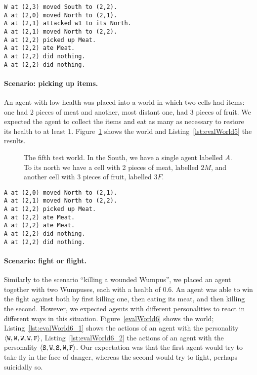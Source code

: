 \noindent
\begin{minipage}{\linewidth}
\begin{lstlisting}[caption=Actions in the scenario ``killing a wounded Wumpus''., label=lst:evalWorld4]
W at (2,3) moved South to (2,2).
A at (2,0) moved North to (2,1).
A at (2,1) attacked w1 to its North.
A at (2,1) moved North to (2,2).
A at (2,2) picked up Meat.
A at (2,2) ate Meat.
A at (2,2) did nothing.
A at (2,2) did nothing.
\end{lstlisting}
\end{minipage}

\paragraph{Scenario: picking up items.} An agent with low health was placed into a world in which two cells had items: one had 2 pieces of meat and another, most distant one, had 3 pieces of fruit. We expected the agent to collect the items and eat as many as necessary to restore its health to at least 1. Figure~\ref{fig:evalWorld5} shows the world and Listing~\ref{lst:evalWorld5} the results.

\begin{figure}
	\centering
	
	\caption{The fifth test world. In the South, we have a single agent labelled $A$. To its north we have a cell with 2 pieces of meat, labelled $2M$, and another cell with 3 pieces of fruit, labelled $3F$.}
	\label{fig:evalWorld5}
\end{figure}

\begin{lstlisting}[caption=Actions in the scenario ``picking up items''., label=lst:evalWorld5]
A at (2,0) moved North to (2,1).
A at (2,1) moved North to (2,2).
A at (2,2) picked up Meat.
A at (2,2) ate Meat.
A at (2,2) ate Meat.
A at (2,2) did nothing.
A at (2,2) did nothing.
\end{lstlisting}

\paragraph{Scenario: fight or flight.}  Similarly to the scenario ``killing a wounded Wumpus'', we placed an agent together with two Wumpuses, each with a health of 0.6. An agent was able to win the fight against both by first killing one, then eating its meat, and then killing the second. However, we expected agents with different personalities to react in different ways in this situation. Figure~\ref{evalWorld6} shows the world; Listing~\ref{lst:evalWorld6_1} shows the actions of an agent with the personality $\langle \mathtt{W},\mathtt{W}, \mathtt{W}, \mathtt{W}, \mathtt{F} \rangle$, Listing~\ref{lst:evalWorld6_2} the actions of an agent with the personality $\langle \mathtt{S},\mathtt{W}, \mathtt{S}, \mathtt{W}, \mathtt{F} \rangle$. Our expectation was that the first agent would try to take fly in the face of danger, whereas the second would try to fight, perhaps suicidally so.


